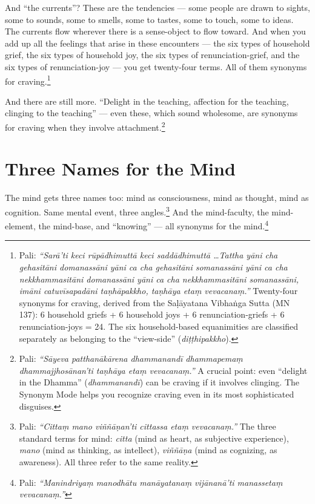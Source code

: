 And ``the currents''? These are the tendencies --- some people are drawn to sights, some to sounds, some to smells, some to tastes, some to touch, some to ideas. The currents flow wherever there is a sense-object to flow toward. And when you add up all the feelings that arise in these encounters --- the six types of household grief, the six types of household joy, the six types of renunciation-grief, and the six types of renunciation-joy --- you get twenty-four terms. All of them synonyms for craving.\footnote{Pali: \textit{``Sarā'ti keci rūpādhimuttā keci saddādhimuttā \ldots Tattha yāni cha gehasitāni domanassāni yāni ca cha gehasitāni somanassāni yāni ca cha nekkhammasitāni domanassāni yāni ca cha nekkhammasitāni somanassāni, imāni catuvīsapadāni taṇhāpakkho, taṇhāya etaṃ vevacanaṃ.''} Twenty-four synonyms for craving, derived from the Saḷāyatana Vibhaṅga Sutta (MN 137): 6 household griefs + 6 household joys + 6 renunciation-griefs + 6 renunciation-joys = 24. The six household-based equanimities are classified separately as belonging to the ``view-side'' (\textit{diṭṭhipakkho}).}

And there are still more. ``Delight in the teaching, affection for the teaching, clinging to the teaching'' --- even these, which sound wholesome, are synonyms for craving when they involve attachment.\footnote{Pali: \textit{``Sāyeva patthanākārena dhammanandī dhammapemaṃ dhammajjhosānan'ti taṇhāya etaṃ vevacanaṃ.''} A crucial point: even ``delight in the Dhamma'' (\textit{dhammanandī}) can be craving if it involves clinging. The Synonym Mode helps you recognize craving even in its most sophisticated disguises.}

\section*{Three Names for the Mind}

The mind gets three names too: mind as consciousness, mind as thought, mind as cognition. Same mental event, three angles.\footnote{Pali: \textit{``Cittaṃ mano viññāṇan'ti cittassa etaṃ vevacanaṃ.''} The three standard terms for mind: \textit{citta} (mind as heart, as subjective experience), \textit{mano} (mind as thinking, as intellect), \textit{viññāṇa} (mind as cognizing, as awareness). All three refer to the same reality.} And the mind-faculty, the mind-element, the mind-base, and ``knowing'' --- all synonyms for the mind.\footnote{Pali: \textit{``Manindriyaṃ manodhātu manāyatanaṃ vijānanā'ti manassetaṃ vevacanaṃ.''}}

